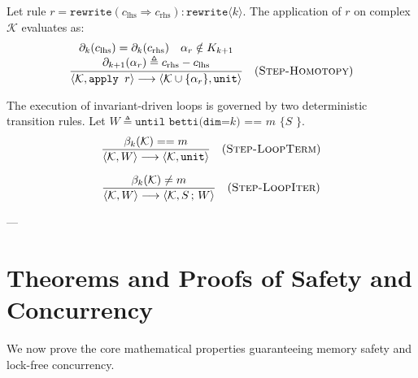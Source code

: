 \begin{definition}
Let rule $r = \texttt{rewrite}(c_{\text{lhs}} \Rightarrow c_{\text{rhs}}) : \texttt{rewrite}\langle k \rangle$. The application of $r$ on complex $\mathcal{K}$ evaluates as:
\begin{equation}
    \frac{
        \begin{array}{c}
            \partial_k(c_{\text{lhs}}) = \partial_k(c_{\text{rhs}}) \quad 
            \alpha_r \notin K_{k+1} \\
            \partial_{k+1}(\alpha_r) \triangleq c_{\text{rhs}} - c_{\text{lhs}}
        \end{array}
    }{
        \langle \mathcal{K}, \texttt{apply } r \rangle \longrightarrow \langle \mathcal{K} \cup \{\alpha_r\}, \texttt{unit} \rangle
    } \quad (\textsc{Step-Homotopy})
\end{equation}
\end{definition}

\begin{definition}
The execution of invariant-driven loops is governed by two deterministic transition rules. 
Let $W \triangleq \texttt{until betti(dim=}k\texttt{) == } m \texttt{ \{ } S \texttt{ \}}$.
\begin{gather}
    \frac{\beta_k(\mathcal{K}) == m}{\langle \mathcal{K}, W \rangle \longrightarrow \langle \mathcal{K}, \texttt{unit} \rangle} \quad (\textsc{Step-LoopTerm}) \\[1.5ex]
    \frac{\beta_k(\mathcal{K}) \neq m}{\langle \mathcal{K}, W \rangle \longrightarrow \langle \mathcal{K}, S \,;\, W \rangle} \quad (\textsc{Step-LoopIter})
\end{gather}
\end{definition}

---

\section{Theorems and Proofs of Safety and Concurrency}
\label{sec:theorems_proofs}

We now prove the core mathematical properties guaranteeing memory safety and lock-free concurrency.

